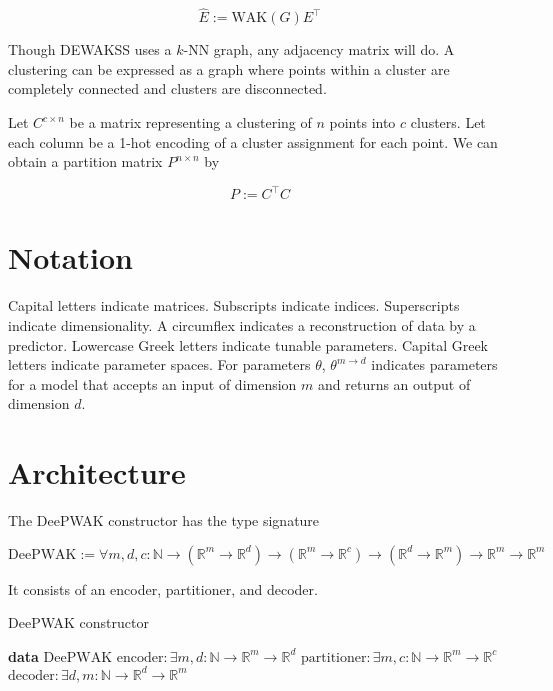 \documentclass{article}
\begin{document}
\begin{equation}
\hat{E} := \mathrm{WAK}(G)E^\top
\end{equation}

Though DEWAKSS uses a $k$-NN graph, any adjacency matrix will do.
A clustering can be expressed as a graph where points within a cluster are completely connected and clusters are disconnected.

Let $C^{c \times n}$ be a matrix representing a clustering of $n$ points into $c$ clusters. Let each column be a 1-hot encoding of a cluster assignment for each point. We can obtain a partition matrix $P^{n \times n}$ by

\begin{equation}
  P := C^\top C
\end{equation}

\section{Notation}
Capital letters indicate matrices. Subscripts indicate indices. Superscripts indicate dimensionality. A circumflex indicates a reconstruction of data by a predictor. Lowercase Greek letters indicate tunable parameters. Capital Greek letters indicate parameter spaces. For parameters $\theta$, $\theta^{m \to d}$ indicates parameters for a model that accepts an input of dimension $m$ and returns an output of dimension $d$.

\section{Architecture}

The DeePWAK constructor has the type signature

\begin{equation}
  \mathrm{DeePWAK} := \forall m,d,c :\mathbb{N} \to (\mathbb{R}^m \to \mathbb{R}^d) \to (\mathbb{R}^m \to \mathbb{R}^c) \to (\mathbb{R}^d \to \mathbb{R}^m) \to \mathbb{R}^m \to \mathbb{R}^m
\end{equation}

It consists of an encoder, partitioner, and decoder.

\begin{algorithm}
  \caption{DeePWAK constructor}\label{alg:cap}
  \begin{algorithmic}[1]
    \State \textbf{data} $\mathrm{DeePWAK}${
    \State $\mathrm{encoder} : \exists m,d : \mathbb{N} \to \mathbb{R}^m \to \mathbb{R}^d$
    \State $\mathrm{partitioner} : \exists m,c : \mathbb{N} \to \mathbb{R}^m \to \mathbb{R}^c$
    \State $\mathrm{decoder} : \exists d,m : \mathbb{N} \to \mathbb{R}^d \to \mathbb{R}^m$
    }
  \end{algorithmic}
\end{algorithm}
\end{document}
